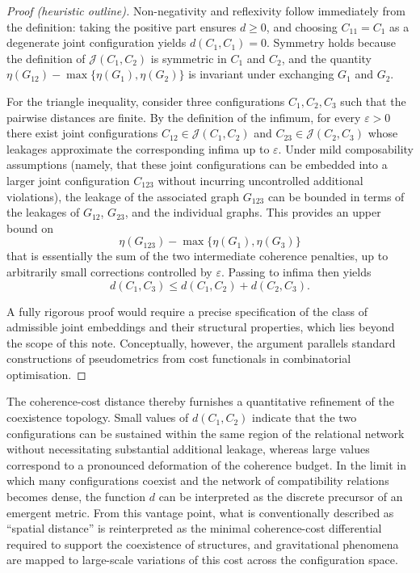 \documentclass[11pt,a4paper]{article}
\theoremstyle{definition}
\begin{document}
\begin{proof}[Proof (heuristic outline)]
Non-negativity and reflexivity follow immediately from the definition: taking the positive part ensures \(d \geq 0\), and choosing \(C_{11} = C_1\) as a degenerate joint configuration yields \(d(C_1,C_1) = 0\). Symmetry holds because the definition of \(\mathcal{J}(C_1,C_2)\) is symmetric in \(C_1\) and \(C_2\), and the quantity \(\eta(G_{12}) - \max\{\eta(G_1),\eta(G_2)\}\) is invariant under exchanging \(G_1\) and \(G_2\).

For the triangle inequality, consider three configurations \(C_1, C_2, C_3\) such that the pairwise distances are finite. By the definition of the infimum, for every \(\varepsilon > 0\) there exist joint configurations \(C_{12} \in \mathcal{J}(C_1,C_2)\) and \(C_{23} \in \mathcal{J}(C_2,C_3)\) whose leakages approximate the corresponding infima up to \(\varepsilon\). Under mild composability assumptions (namely, that these joint configurations can be embedded into a larger joint configuration \(C_{123}\) without incurring uncontrolled additional violations), the leakage of the associated graph \(G_{123}\) can be bounded in terms of the leakages of \(G_{12}\), \(G_{23}\), and the individual graphs. This provides an upper bound on
\[
\eta(G_{123}) - \max\{\eta(G_1),\eta(G_3)\}
\]
that is essentially the sum of the two intermediate coherence penalties, up to arbitrarily small corrections controlled by \(\varepsilon\). Passing to infima then yields
\[
d(C_1,C_3) \leq d(C_1,C_2) + d(C_2,C_3).
\]

A fully rigorous proof would require a precise specification of the class of admissible joint embeddings and their structural properties, which lies beyond the scope of this note. Conceptually, however, the argument parallels standard constructions of pseudometrics from cost functionals in combinatorial optimisation.
\end{proof}

The coherence-cost distance thereby furnishes a quantitative refinement of the coexistence topology. Small values of \(d(C_1,C_2)\) indicate that the two configurations can be sustained within the same region of the relational network without necessitating substantial additional leakage, whereas large values correspond to a pronounced deformation of the coherence budget. In the limit in which many configurations coexist and the network of compatibility relations becomes dense, the function \(d\) can be interpreted as the discrete precursor of an emergent metric. From this vantage point, what is conventionally described as “spatial distance” is reinterpreted as the minimal coherence-cost differential required to support the coexistence of structures, and gravitational phenomena are mapped to large-scale variations of this cost across the configuration space.
\end{document}
